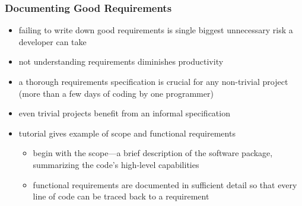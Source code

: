 \documentclass{beamer}
\begin{document}
\begin{frame}
  \frametitle{Documenting Good Requirements}
  \begin{itemize}
    \item failing to write down good requirements is single biggest unnecessary risk
      a developer can take
    \item not understanding requirements diminishes productivity
    \item a thorough requirements specification is crucial for any non-trivial project (more
      than a few days of coding by one programmer)
    \item even trivial projects benefit from an informal specification 
    \item tutorial gives example of scope and functional requirements
      \begin{itemize}
        \item begin with the scope---a brief description of the software package, summarizing the 
          code's high-level capabilities
        \item functional requirements are documented in sufficient detail so that 
          every line of code can be traced back to a requirement
      \end{itemize}
  \end{itemize}
\end{frame}
\end{document}
